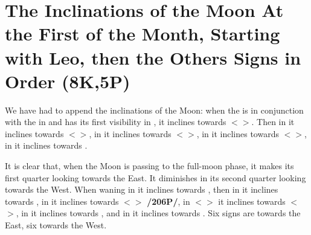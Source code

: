 \section{The Inclinations of the Moon At the First of the Month, Starting with Leo, then the Others Signs in Order (8K,5P)}

We have had to append the inclinations of the Moon: when the \Moon\xspace is in conjunction with the \Sun\xspace in
\Cancer\xspace and has its first visibility in \Leo, it inclines towards $<$\Taurus$>$. Then in \Virgo\xspace it inclines towards $<$\Aries$>$, in \Libra\xspace it inclines towards $<$\Pisces$>$, in \Scorpio\xspace it inclines towards $<$\Aquarius$>$, in \Sagittarius\xspace it inclines towards \Capricorn. 

It is clear that, when the Moon is passing to the full-moon phase, it makes its first quarter looking towards the East. It diminishes in its second quarter looking towards the West. When waning in \Capricorn\xspace it inclines towards \Sagittarius, then in \Aquarius it inclines towards \Scorpio, in \Pisces\xspace it inclines towards $<$\Libra$>$ \textbf{/206P/}, in $<$\Aries$>$ it inclines towards $<$\Virgo$>$, in \Taurus\xspace it inclines towards \Leo, and in \Gemini\xspace it inclines towards \Cancer. Six signs are towards the East, six towards the West.

